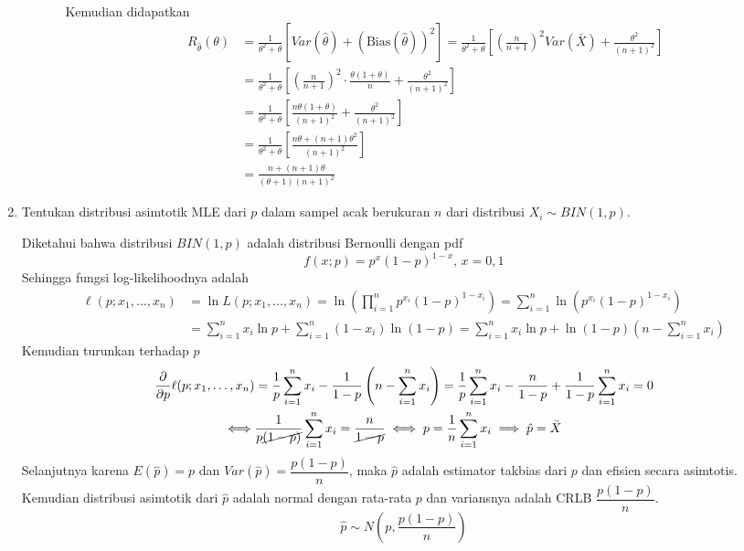 \documentclass{exam}
\newcommand{\del}{\partial}
\begin{document}
\begin{enumerate}
\begin{solution}
\begin{enumerate}
\begin{itemize}
\begin{align*}
                \end{align*}
                Kemudian didapatkan
                \begin{align*}
                    R_{\hat{\theta}}(\theta) &= \frac{1}{\theta^2+\theta}\left[Var(\hat{\theta}) + (\text{Bias}(\hat{\theta}))^2\right]= \frac{1}{\theta^2+\theta}\left[\left(\frac{n}{n+1}\right)^2Var(\bar{X}) + \frac{\theta^2}{(n+1)^2}\right]\\
                    &= \frac{1}{\theta^2+\theta}\left[\left(\frac{n}{n+1}\right)^2\cdot\frac{\theta(1+\theta)}{n} + \frac{\theta^2}{(n+1)^2}\right]\\
                    &= \frac{1}{\theta^2+\theta}\left[\frac{n\theta(1+\theta)}{(n+1)^2} + \frac{\theta^2}{(n+1)^2}\right]\\
                    &= \frac{1}{\theta^2+\theta}\left[\frac{n\theta+(n+1)\theta^2}{(n+1)^2}\right] \\
                    &= \frac{n+(n+1)\theta}{(\theta+1)(n+1)^2}
                \end{align*}
            \end{itemize}
            
        \end{enumerate}
    \end{solution}

    \item Tentukan distribusi asimtotik MLE dari $p$ dalam sampel acak berukuran $n$ dari distribusi $X_i\sim BIN(1, p)$.
    \begin{solution}
        Diketahui bahwa distribusi $BIN(1,p)$ adalah distribusi Bernoulli dengan pdf 
        \[f(x;p) = p^x(1-p)^{1-x},\,x=0,1\]
        Sehingga fungsi log-likelihoodnya adalah
        \begin{align*}
            \ell(p;x_1,\dots,x_n) &= \ln L(p;x_1,\dots,x_n) = \ln\left(\prod_{i=1}^n p^{x_i}(1-p)^{1-x_i}\right) = \sum_{i=1}^n \ln\left(p^{x_i}(1-p)^{1-x_i}\right)\\
            &= \sum_{i=1}^n x_i\ln p + \sum_{i=1}^n (1-x_i)\ln(1-p) = \sum_{i=1}^n x_i\ln p + \ln(1-p)\left(n-\sum_{i=1}^n x_i\right)
        \end{align*}
        Kemudian turunkan terhadap $p$
        \begin{align*}
            \dfrac{\del}{\del p}\ell(p;x_1,\dots,x_n) &= \frac{1}{p}\sum_{i=1}^n x_i - \frac{1}{1-p}\left(n-\sum_{i=1}^n x_i\right) = \frac{1}{p}\sum_{i=1}^n x_i - \frac{n}{1-p} + \frac{1}{1-p}\sum_{i=1}^n x_i = 0\\
            \iff& \frac{1}{p\cancel{(1-p)}}\sum_{i=1}^n x_i = \frac{n}{\cancel{1-p}} \iff p = \frac{1}{n}\sum_{i=1}^n x_i \implies \hat{p} = \bar{X}
        \end{align*}
        Selanjutnya karena $E(\hat{p}) = p$ dan $Var(\hat{p}) = \dfrac{p(1-p)}{n}$, maka $\hat{p}$ adalah estimator takbias dari $p$ dan efisien secara asimtotis. Kemudian distribusi asimtotik dari $\hat{p}$ adalah normal dengan rata-rata $p$ dan variansnya adalah CRLB $\dfrac{p(1-p)}{n}$.
        \[\hat{p}\sim N\left(p,\dfrac{p(1-p)}{n}\right)\]
    \end{solution}
\end{enumerate}
\end{document}
